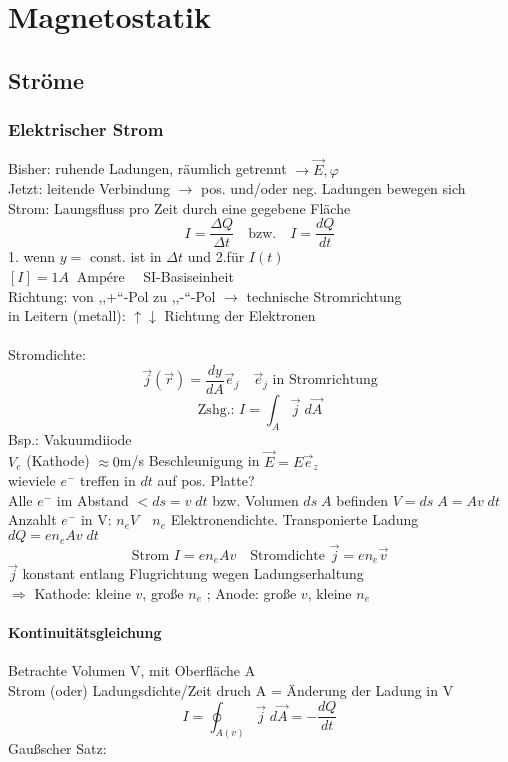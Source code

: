 \documentclass[titlepage,12pt,a4paper,ngerman]{report}
\newcommand{\tx}[1]{\textrm{#1}}
\begin{document}
\chapter{Magnetostatik}
\setcounter{section}{5}
\section{Ströme}
\subsection{Elektrischer Strom}
Bisher: ruhende Ladungen, räumlich getrennt $\rightarrow \vec{E}, \varphi$\\
Jetzt: leitende Verbindung $\rightarrow$ pos. und/oder neg. Ladungen bewegen sich\\
Strom: Laungsfluss pro Zeit durch eine gegebene Fläche
$$\boxed{I= \frac{\Delta Q}{\Delta t}}\quad \tx{bzw.} \quad \boxed{I=\frac{dQ}{dt}}$$
1. wenn $y = $ const. ist in $\Delta t$ und 2.für $I(t)$\\
$[I] = 1 A \ \tx{ Ampére} \quad$ SI-Basiseinheit\\
Richtung: von ,,+``-Pol zu ,,-``-Pol $\rightarrow$ technische Stromrichtung\\
in Leitern (metall): $\uparrow \downarrow$ Richtung der Elektronen\\\\
Stromdichte:
$$ \vec{j}(\vec{r}) = \frac{dy}{dA} \vec{e}_{j} \quad \vec{e}_{j} \tx{ in Stromrichtung}$$
$$\tx{Zshg.: } I = \int_A \vec{j} \; d\vec{A}$$
Bsp.: Vakuumdiiode\\
$V_e$ (Kathode) $\approx 0 $m/s Beschleunigung in $\vec{E} = E \vec{e}_z$\\
wieviele $e^-$ treffen in $dt$ auf pos. Platte?\\
Alle $e^-$ im Abstand $< ds = v\; dt$ bzw. Volumen $ds\; A$ befinden $V = ds\; A = Av \; dt$ Anzahlt $e^-$ in V: $n_e V \quad n_e$ Elektronendichte. Transponierte Ladung $dQ = e n_e A v \; dt$
$$\tx{Strom } \boxed{I= e n_e A v} \quad \tx{Stromdichte } \boxed{\vec{j} = e n_e \vec{v}} $$
$\vec{j}$ konstant entlang Flugrichtung wegen Ladungserhaltung\\
$\Rightarrow$ Kathode: kleine $v$, große $n_e$ ; Anode: große $v$, kleine $n_e$
\subsubsection{Kontinuitätsgleichung}
Betrachte Volumen V, mit Oberfläche A\\
Strom (oder) Ladungsdichte/Zeit  druch A = Änderung der Ladung in V
$$I = \oint_{A(v)} \vec{j} \; d\vec{A} = -\frac{dQ}{dt}$$
Gaußscher Satz:
\end{document}
